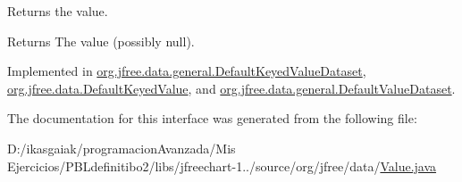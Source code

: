 Returns the value.

\begin{DoxyReturn}{Returns}
The value (possibly {\ttfamily null}). 
\end{DoxyReturn}


Implemented in \mbox{\hyperlink{classorg_1_1jfree_1_1data_1_1general_1_1_default_keyed_value_dataset_af2554d604d08db7255c29290c009bb6c}{org.\+jfree.\+data.\+general.\+Default\+Keyed\+Value\+Dataset}}, \mbox{\hyperlink{classorg_1_1jfree_1_1data_1_1_default_keyed_value_a2eaff5e8eea89cc853a97b60aa4d3966}{org.\+jfree.\+data.\+Default\+Keyed\+Value}}, and \mbox{\hyperlink{classorg_1_1jfree_1_1data_1_1general_1_1_default_value_dataset_ab27ab5fa97b9cadbb6df5c039688ab69}{org.\+jfree.\+data.\+general.\+Default\+Value\+Dataset}}.



The documentation for this interface was generated from the following file\+:\begin{DoxyCompactItemize}
\item 
D\+:/ikasgaiak/programacion\+Avanzada/\+Mis Ejercicios/\+P\+B\+Ldefinitibo2/libs/jfreechart-\/1../source/org/jfree/data/\mbox{\hyperlink{_value_8java}{Value.\+java}}\end{DoxyCompactItemize}
